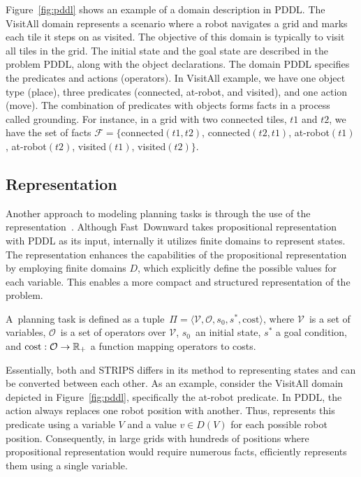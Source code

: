 Figure~\ref{fig:pddl} shows an example of a domain description in PDDL. The VisitAll domain represents a scenario where a robot navigates a grid and marks each tile it steps on as visited. The objective of this domain is typically to visit all tiles in the grid. The initial state and the goal state are described in the problem PDDL, along with the object declarations. The domain PDDL specifies the predicates and actions (operators). In VisitAll example, we have one object type (place), three predicates (connected, at-robot, and visited), and one action (move). The combination of predicates with objects forms facts in a process called grounding. For instance, in a grid with two connected tiles, $t1$ and $t2$, we have the set of facts $\mathcal{F}=\{$connected$(t1,t2)$, connected$(t2,t1)$, at-robot$(t1)$, at-robot$(t2)$, visited$(t1)$, visited$(t2)\}$.

\subsection{\sas Representation}
\label{sec:background_sas}

Another approach to modeling planning tasks is through the use of the \sas representation~\cite{Backstrom.Nebel/1995}. Although Fast~Downward takes propositional representation with PDDL as its input, internally it utilizes finite domains to represent states. The \sas representation enhances the capabilities of the propositional representation by employing finite domains $D$, which explicitly define the possible values for each variable. This enables a more compact and structured representation of the problem.

\begin{definition}\label{def:sasplanningtask}
    A~\sas planning task is defined as a tuple~$\Pi=\langle\mathcal{V},\mathcal{O},s_0,s^*, \text{cost}\rangle$, where $\mathcal{V}$~is a set of variables, $\mathcal{O}$~is a set of operators over $\mathcal{V}$, $s_0$~an initial state, $s^*$ a goal condition, and $\text{cost}:\mathcal{O}\rightarrow\mathbb{R}_{+}$ a function mapping operators to costs.
\end{definition}

Essentially, both \sas and STRIPS differs in its method to representing states and can be converted between each other. As an example, consider the VisitAll domain depicted in Figure~\ref{fig:pddl}, specifically the at-robot predicate. In PDDL, the action always replaces one robot position with another. Thus, \sas represents this predicate using a variable $V$ and a value $v \in D(V)$ for each possible robot position. Consequently, in large grids with hundreds of positions where propositional representation would require numerous facts, \sas efficiently represents them using a single variable.


